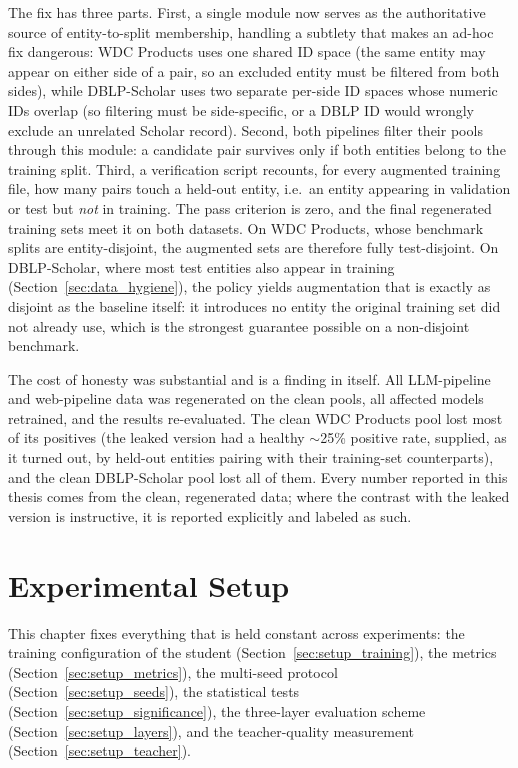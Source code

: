 \documentclass[a4paper,oneside,bibliography=totoc]{scrbook}
\begin{document}
The fix has three parts. First, a single module now serves as the authoritative source of entity-to-split membership, handling a subtlety that makes an ad-hoc fix dangerous: WDC Products uses one shared ID space (the same entity may appear on either side of a pair, so an excluded entity must be filtered from both sides), while DBLP-Scholar uses two separate per-side ID spaces whose numeric IDs overlap (so filtering must be side-specific, or a DBLP ID would wrongly exclude an unrelated Scholar record). Second, both pipelines filter their pools through this module: a candidate pair survives only if both entities belong to the training split. Third, a verification script recounts, for every augmented training file, how many pairs touch a held-out entity, i.e.\ an entity appearing in validation or test but \emph{not} in training. The pass criterion is zero, and the final regenerated training sets meet it on both datasets. On WDC Products, whose benchmark splits are entity-disjoint, the augmented sets are therefore fully test-disjoint. On DBLP-Scholar, where most test entities also appear in training (Section~\ref{sec:data_hygiene}), the policy yields augmentation that is exactly as disjoint as the baseline itself: it introduces no entity the original training set did not already use, which is the strongest guarantee possible on a non-disjoint benchmark.

The cost of honesty was substantial and is a finding in itself. All LLM-pipeline and web-pipeline data was regenerated on the clean pools, all affected models retrained, and the results re-evaluated. The clean WDC Products pool lost most of its positives (the leaked version had a healthy $\sim$25\% positive rate, supplied, as it turned out, by held-out entities pairing with their training-set counterparts), and the clean DBLP-Scholar pool lost all of them. Every number reported in this thesis comes from the clean, regenerated data; where the contrast with the leaked version is instructive, it is reported explicitly and labeled as such.

\chapter{Experimental Setup}
\label{ch:setup}

This chapter fixes everything that is held constant across experiments: the training configuration of the student (Section~\ref{sec:setup_training}), the metrics (Section~\ref{sec:setup_metrics}), the multi-seed protocol (Section~\ref{sec:setup_seeds}), the statistical tests (Section~\ref{sec:setup_significance}), the three-layer evaluation scheme (Section~\ref{sec:setup_layers}), and the teacher-quality measurement (Section~\ref{sec:setup_teacher}).
\end{document}
